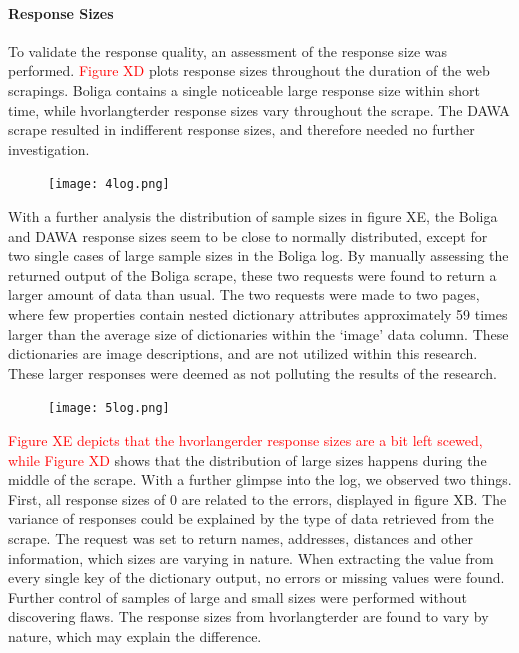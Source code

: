 \documentclass[12pt,a4paper]{article}
\begin{document}
\paragraph{Response Sizes\newline}
To validate the response quality, an assessment of the response size was performed. \textcolor{red}{Figure XD} plots response sizes throughout the duration of the web scrapings. Boliga contains a single noticeable large response size within short time, while hvorlangterder response sizes vary throughout the scrape. The DAWA scrape resulted in indifferent response sizes, and therefore needed no further investigation. 
\begin{figure}[H]
  \centering
   \caption{}
   \texttt{[image: 4log.png]} 
  \label{fig:}
\end{figure}
With a further analysis the distribution of sample sizes in figure XE, the Boliga and DAWA response sizes seem to be close to normally distributed, except for two single cases of large sample sizes in the Boliga log. By manually assessing the returned output of the Boliga scrape, these two requests were found to return a larger amount of data than usual. The two requests were made to two pages, where few properties contain nested dictionary attributes approximately 59 times larger than the average size of dictionaries within the ‘image’ data column. These dictionaries are image descriptions, and are not utilized within this research. These larger responses were deemed as not polluting the results of the research.
\begin{figure}[H]
  \centering
   \caption{}
   \texttt{[image: 5log.png]} 
  \label{fig:}
\end{figure}
\textcolor{red}{Figure XE depicts that the hvorlangerder response sizes are a bit left scewed, while Figure XD} shows that the distribution of large sizes happens during the middle of the scrape. With a further glimpse into the log, we observed two things. First, all response sizes of 0 are related to the errors, displayed in figure XB. The variance of responses could be explained by the type of data retrieved from the scrape. The request was set to return names, addresses, distances and other information, which sizes are varying in nature. When extracting the value from every single key of the dictionary output, no errors or missing values were found. Further control of samples of large and small sizes were performed without discovering flaws. The response sizes from hvorlangterder are found to vary by nature, which may explain the difference.  
\end{document}

